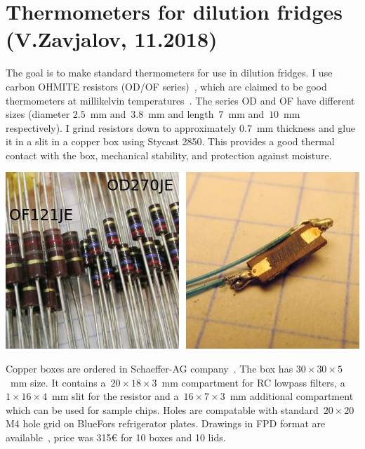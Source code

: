 \documentclass[a4paper]{article}
\begin{document}
\section*{Thermometers for dilution fridges (V.Zavjalov, 11.2018)}

The goal is to make standard thermometers for use in dilution fridges. I
use carbon OHMITE resistors (OD/OF series)~\cite{ohmite_catalog}, which
are claimed to be good thermometers at millikelvin
temperatures~\cite{therm_paper}. The series OD and OF have different
sizes (diameter $2.5$~mm and~$3.8$~mm and length~$7$~mm and~$10$~mm
respectively). I grind resistors down to approximately $0.7$~mm thickness
and glue it in a slit in a copper box using Stycast 2850. This provides
a good thermal contact with the box, mechanical stability, and protection
against moisture.

\begin{center}
\includegraphics[width=\linewidth]{img/res.jpg}
\end{center}

Copper boxes are ordered in Schaeffer-AG company~\cite{schaeffer}.  The
box has $30\times30\times5$~mm size. It contains a~$20\times18\times3$~mm
compartment for RC lowpass filters, a $1\times16\times4$~mm slit for the
resistor and a~$16\times7\times3$~mm additional compartment which can be used for
sample chips. Holes are compatable with standard~$20\times20$ M4 hole grid
on BlueFors refrigerator plates. Drawings in FPD format are available~\cite{box_drawings},
price was 315\euro{} for 10 boxes and 10 lids.
\end{document}
